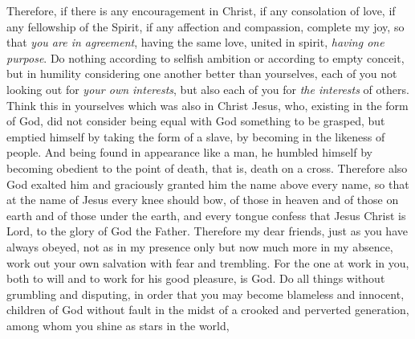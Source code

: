 \begin{biblechapter} %
 Therefore, if there is any encouragement in Christ, if any consolation of love, if any fellowship of the Spirit, if any affection and compassion,
\verse complete my joy, so that \textit{you are in agreement}, having the same love, united in spirit, \textit{having one purpose}.
\verse Do nothing according to selfish ambition or according to empty conceit, but in humility considering one another better than yourselves,
\verse each of you not looking out for \textit{your own interests}, but also each of you for \textit{the interests} of others.
 Think this in yourselves which was also in Christ Jesus,
\verse who, existing in the form of God, 
did not consider being equal with God something to be grasped,
\verse but emptied himself 
by taking the form of a slave, 
by becoming in the likeness of people. 
And being found in appearance like a man,
\verse he humbled himself 
by becoming obedient to the point of death, 
that is, death on a cross.
\verse Therefore also God exalted him 
and graciously granted him the name above every name,
\verse so that at the name of Jesus 
every knee should bow, 
of those in heaven and of those on earth and of those under the earth,
\verse and every tongue confess 
that Jesus Christ is Lord, 
to the glory of God the Father.
 Therefore my dear friends, just as you have always obeyed, not as in my presence only but now much more in my absence, work out your own salvation with fear and trembling.
\verse For the one at work in you, both to will and to work for his good pleasure, is God.
\verse Do all things without grumbling and disputing,
\verse in order that you may become blameless and innocent, children of God without fault in the midst of a crooked and perverted generation, among whom you shine as stars in the world,

\end{biblechapter}
